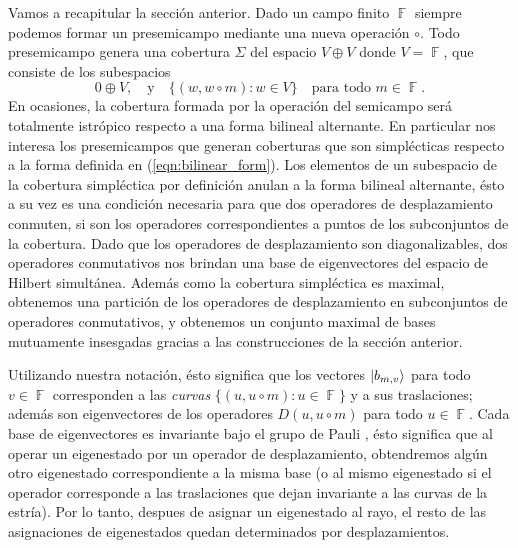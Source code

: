 \documentclass[a4paper,11pt]{report}
\DeclareMathOperator{\F}{\mathbb{F}}
\begin{document}
  Vamos a recapitular la sección anterior. Dado un campo
  finito $\F$ siempre podemos formar un presemicampo
  mediante una nueva operación $\circ$. Todo presemicampo
  genera una cobertura $\Sigma$ del espacio $V \oplus V$
  donde $V = \F$, que consiste de los subespacios
  \[
    0 \oplus V,
    \quad
    \text{y}
    \quad
    \{(w, w \circ m) : w \in V\} 
    \quad \text{para todo } m \in \F.
  \] 
  En ocasiones, la cobertura formada por la operación del
  semicampo será totalmente istrópico respecto a una forma
  bilineal alternante. En particular nos interesa los
  presemicampos que generan coberturas que son simplécticas
  respecto a la forma definida en (\ref{eqn:bilinear_form}).
  Los elementos de un subespacio de la cobertura simpléctica
  por definición anulan a la forma bilineal alternante, ésto
  a su vez es una condición necesaria para que dos
  operadores de desplazamiento conmuten, si son los
  operadores correspondientes a puntos de los subconjuntos
  de la cobertura.  Dado que los operadores de
  desplazamiento son diagonalizables, dos operadores
  conmutativos nos brindan una base de eigenvectores del
  espacio de Hilbert simultánea. Además como la cobertura
  simpléctica es maximal, obtenemos una partición de los
  operadores de desplazamiento en subconjuntos de operadores
  conmutativos, y obtenemos un conjunto maximal de bases
  mutuamente insesgadas gracias a las construcciones de la
  sección anterior.

  Utilizando nuestra notación, ésto significa que los
  vectores $\ket{b_{m,v}}$ para todo $v \in \F$ corresponden
  a las \textit{curvas} $\{(u, u \circ m) : u \in \F\}$ y a
  sus traslaciones; además son eigenvectores de los
  operadores $D(u, u \circ m)$ para todo $u \in \F$. Cada
  base de eigenvectores es invariante bajo el grupo de
  Pauli \cite{calderbank}, ésto significa que al operar un
  eigenestado por un operador de desplazamiento, obtendremos
  algún otro eigenestado correspondiente a la misma base (o
  al mismo eigenestado si el operador corresponde a las
  traslaciones que dejan invariante a las curvas de la
  estría). Por lo tanto, despues de asignar un eigenestado
  al rayo, el resto de las asignaciones de eigenestados
  quedan determinados por desplazamientos.
\end{document}
